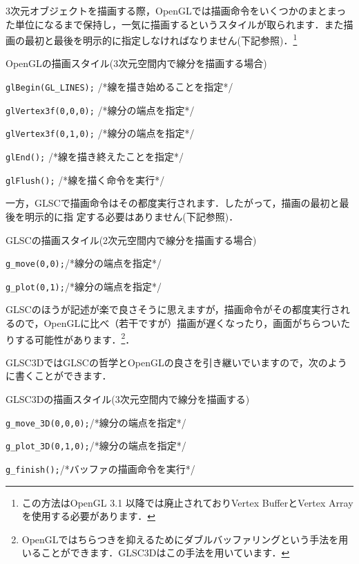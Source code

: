\documentclass[platex,a4paper,12pt]{jsarticle}%
\begin{document}
3次元オブジェクトを描画する際，OpenGLでは描画命令をいくつかのまとまった単位になるまで保持し，一気に描画するというスタイルが取られます．また描画の最初と最後を明示的に指定しなければなりません(下記参照)．\footnote{この方法はOpenGL 3.1 以降では廃止されておりVertex BufferとVertex Arrayを使用する必要があります．}

\begin{itembox}[l]{OpenGLの描画スタイル(3次元空間内で線分を描画する場合)}
	
	\verb|glBegin(GL_LINES);|	\hspace{20mm}/*線を描き始めることを指定*/
	
	\verb|glVertex3f(0,0,0);|		\hspace{20mm}/*線分の端点を指定*/
	
	\verb|glVertex3f(0,1,0);|		\hspace{20mm}/*線分の端点を指定*/
	
	\verb|glEnd();|				\hspace{38mm}/*線を描き終えたことを指定*/

	\verb|glFlush();|				\hspace{34mm}/*線を描く命令を実行*/
\end{itembox}

一方，GLSCで描画命令はその都度実行されます．したがって，描画の最初と最後を明示的に指
定する必要はありません(下記参照)．

\begin{itembox}[l]{GLSCの描画スタイル(2次元空間内で線分を描画する場合)}
	
	\verb|g_move(0,0);|\hspace{30mm}/*線分の端点を指定*/
	
	\verb|g_plot(0,1);|\hspace{30mm}/*線分の端点を指定*/

\end{itembox}

GLSCのほうが記述が楽で良さそうに思えますが，描画命令がその都度実行されるので，OpenGLに比べ（若干ですが）描画が遅くなったり，画面がちらついたりする可能性があります．\footnote{OpenGLではちらつきを抑えるためにダブルバッファリングという手法を用いることができます．GLSC3Dはこの手法を用いています．}．

GLSC3DではGLSCの哲学とOpenGLの良さを引き継いでいますので，次のように書くことができます．

\begin{itembox}[l]{GLSC3Dの描画スタイル(3次元空間内で線分を描画する)}
	
	\verb|g_move_3D(0,0,0);|\hspace{30mm}/*線分の端点を指定*/
	
	\verb|g_plot_3D(0,1,0);|\hspace{30mm}/*線分の端点を指定*/
	
	\verb|g_finish();|\hspace{35mm}/*バッファの描画命令を実行*/

\end{itembox}
  
\end{document}
